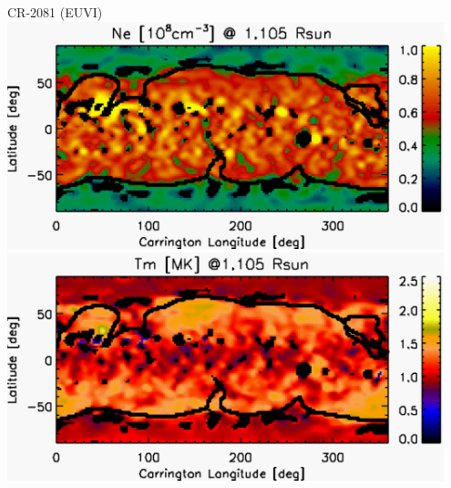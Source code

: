 \documentclass{beamer}
\begin{document}
{\begin{columns}
\centering
CR-2081 (EUVI)
\vskip 0.3cm
\includegraphics[width=0.95\textwidth]{figuras/Ne_1105_CR2081.pdf}
\includegraphics[width=0.95\textwidth]{figuras/Tm_1105_CR2081.pdf}


\end{columns}}
\end{document}
